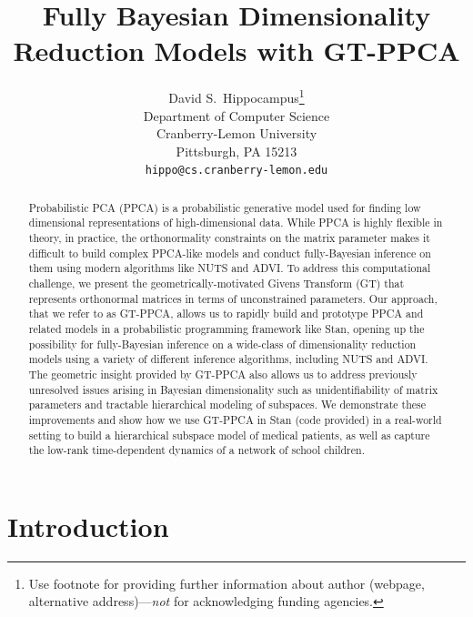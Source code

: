 \documentclass{article}
\title{Fully Bayesian Dimensionality Reduction Models with GT-PPCA}
\author{
  David S.~Hippocampus\thanks{Use footnote for providing further
    information about author (webpage, alternative
    address)---\emph{not} for acknowledging funding agencies.} \\
  Department of Computer Science\\
  Cranberry-Lemon University\\
  Pittsburgh, PA 15213 \\
  \texttt{hippo@cs.cranberry-lemon.edu} \\
}
\begin{document}

\maketitle

\begin{abstract}
Probabilistic PCA (PPCA) is a probabilistic generative model used for finding low dimensional representations of high-dimensional data. While PPCA is highly flexible in theory, in practice, the orthonormality constraints on the matrix parameter makes it difficult to build complex PPCA-like models and conduct fully-Bayesian inference on them using modern algorithms like NUTS and ADVI. To address this computational challenge, we present the geometrically-motivated Givens Transform (GT) that represents orthonormal matrices in terms of unconstrained parameters. Our approach, that we refer to as GT-PPCA, allows us to rapidly build and prototype PPCA and related models in a probabilistic programming framework like Stan, opening up the possibility for fully-Bayesian inference on a wide-class of dimensionality reduction models using a variety of different inference algorithms, including NUTS and ADVI. The geometric insight provided by GT-PPCA also allows us to address previously unresolved issues arising in Bayesian dimensionality such as unidentifiability of matrix parameters and tractable hierarchical modeling of subspaces. We demonstrate these improvements and show how we use GT-PPCA in Stan (code provided) in a real-world setting to build a hierarchical subspace model of medical patients, as well as capture the low-rank time-dependent dynamics of a network of school children.
\end{abstract}

\section{Introduction}
\end{document}
